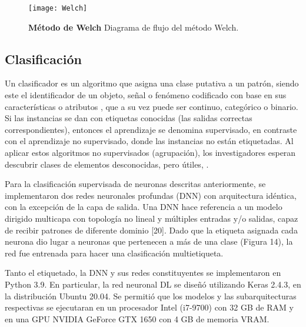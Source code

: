 \documentclass[11pt,letterpaper]{article}
\numberwithin{equation}{subsection}
\numberwithin{table}{subsection}
\begin{document}
\begin{figure}[H]
\centering
	\texttt{[image: Welch]}
	\captionsetup{labelfont=bf}
	\caption{\scriptsize \textbf{Método de Welch} Diagrama de flujo del método Welch.}
	\label{fig:Fig15}
\end{figure}






\subsection{Clasificación}

\noindent Un clasificador es un algoritmo que asigna una clase putativa a un patrón, siendo este el identificador de un objeto, señal o fenómeno codificado con base en sus características o atributos \cite{harrington2012machine}, que a su vez puede ser continuo, categórico o binario. Si las instancias se dan con etiquetas conocidas (las salidas correctas correspondientes), entonces el aprendizaje se denomina supervisado, en contraste con el aprendizaje no supervisado, donde las instancias no están etiquetadas. Al aplicar estos algoritmos no supervisados (agrupación), los investigadores esperan descubrir clases de elementos desconocidas, pero útiles, \cite{kotsiantis2007supervised} .


\bigskip
\noindent Para la clasificación supervisada de neuronas descritas anteriormente, se implementaron dos redes neuronales profundas (DNN) con arquitectura idéntica, con la excepción de la capa de salida. Una DNN hace referencia a un modelo dirigido multicapa con topología no lineal y múltiples entradas y/o salidas, capaz de recibir patrones de diferente dominio [20]. Dado que la etiqueta asignada cada neurona dio lugar a neuronas que pertenecen a más de una clase (Figura 14), la red fue entrenada para hacer una clasificación multietiqueta.


\bigskip
\noindent Tanto el etiquetado, la DNN y sus redes constituyentes se implementaron en Python 3.9. En particular, la red neuronal DL se diseñó utilizando Keras 2.4.3,  en la distribución Ubuntu 20.04. Se permitió que los modelos y las subarquitecturas respectivas se ejecutaran en un procesador Intel (i7-9700) con 32 GB de RAM y en una GPU NVIDIA GeForce GTX 1650 con 4 GB de memoria VRAM.
\end{document}
